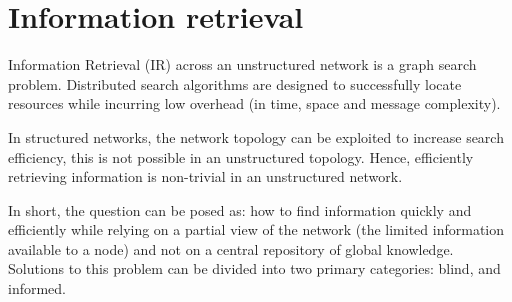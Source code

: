 \newpage


\section{Information retrieval}
\label{sec:ir}


Information Retrieval (IR) across an unstructured network is a graph search problem\cite{lv2002search}. Distributed search algorithms are designed to successfully locate resources while incurring low overhead (in time, space and message complexity)\cite{bisnik2005walk}.

In structured networks, the network topology can be exploited to increase search efficiency, this is not possible in an unstructured topology\cite{khatibi2021rd, li2005searching}. Hence, efficiently retrieving information is non-trivial in an unstructured network.


In short, the question can be posed as: how to find information quickly and efficiently while relying on a partial view of the network (the limited information available to a node) and not on a central repository of global knowledge. Solutions to this problem can be divided into two primary categories\cite{thampi2010replication}: blind, and informed.


